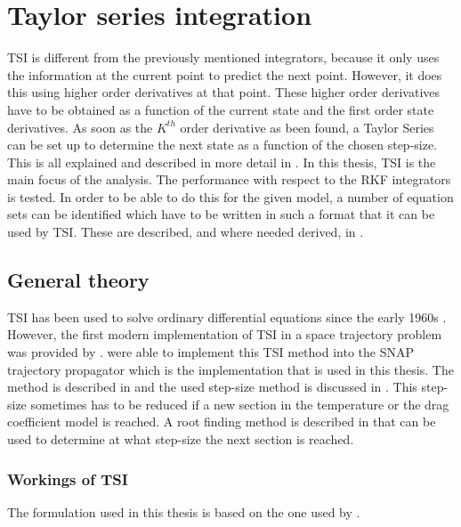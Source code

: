 \chapter{Taylor series integration} %
\label{ch:tsi}
\acf{TSI} is different from the previously mentioned integrators, because it only uses the information at the current point to predict the next point. However, it does this using higher order derivatives at that point. These higher order derivatives have to be obtained as a function of the current state and the first order state derivatives. As soon as the $K^{th}$ order derivative as been found, a Taylor Series can be set up to determine the next state as a function of the chosen step-size. This is all explained and described in more detail in . In this thesis, \ac{TSI} is the main focus of the analysis. The performance with respect to the \ac{RKF} integrators is tested. In order to be able to do this for the given model, a number of equation sets can be identified which have to be written in such a format that it can be used by \ac{TSI}. These are described, and where needed derived, in .

\section{General theory}
\label{sec:genTsiTheory}
\ac{TSI} has been used to solve ordinary differential equations since the early 1960s \citep{scott2008high}. However, the first modern implementation of \ac{TSI} in a space trajectory problem was provided by \cite{montenbruck1992numerical}. \cite{scott2008high} were able to implement this \ac{TSI} method into the SNAP trajectory propagator which is the implementation that is used in this thesis. The method is described in  and the used step-size method is discussed in . This step-size sometimes has to be reduced if a new section in the temperature or the drag coefficient model is reached. A root finding method is described in  that can be used to determine at what step-size the next section is reached.



\subsection{Workings of \ac{TSI}}
\label{subsec:workTsi}
The formulation used in this thesis is based on the one used by \cite{scott2008high}. 

